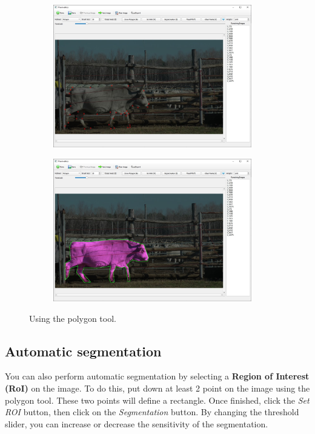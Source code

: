 \documentclass[10pt,a4paper,oneside]{report}             %
\begin{document}
\begin{figure}[H]
	\centering
	\begin{subfigure}{\textwidth}
		\centering 
		\includegraphics[width=0.95\textwidth]{./images/PlaniPoly1.jpg}
	\end{subfigure}
	\begin{subfigure}{\textwidth}
	\centering 
	\includegraphics[width=0.95\textwidth]{./images/PlaniPoly2.jpg}
	\end{subfigure}
	\caption[]
	{\small  Using the polygon tool.}
\end{figure} 

\subsection{Automatic segmentation}

You can also perform automatic segmentation by selecting a \textbf{Region of Interest (RoI)} on the image. To do this, put down at least 2 point on the image using the polygon tool. These two points will define a rectangle. Once finished, click the \textit{Set ROI} button, then click on the \textit{Segmentation} button. By changing the threshold slider, you can increase or decrease the sensitivity of the segmentation.
\end{document}
